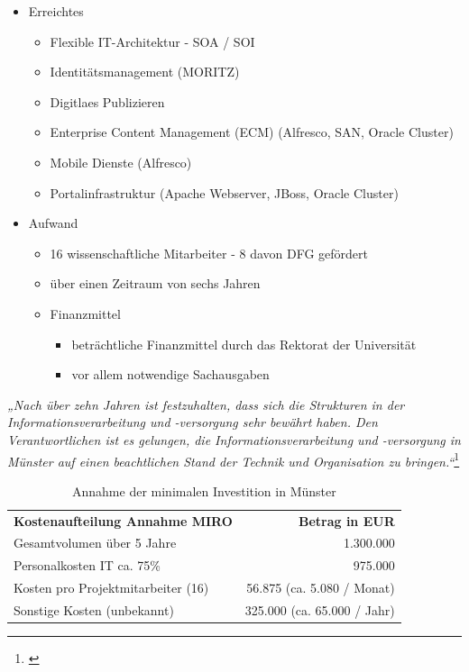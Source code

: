 \begin{itemize}
	\item Erreichtes
	\begin{itemize}
		\item Flexible IT-Architektur - SOA / SOI
		\item Identitätsmanagement (MORITZ)
		\item Digitlaes Publizieren
		\item Enterprise Content Management (ECM) (Alfresco, SAN, Oracle Cluster)
		\item Mobile Dienste (Alfresco)
		\item Portalinfrastruktur (Apache Webserver, JBoss, Oracle Cluster)
	\end{itemize}
	\item Aufwand
	\begin{itemize}
		\item 16 wissenschaftliche Mitarbeiter - 8 davon DFG gefördert
		\item über einen Zeitraum von sechs Jahren
		\item Finanzmittel
		\begin{itemize}
			\item beträchtliche Finanzmittel durch das Rektorat der Universität
			\item vor allem notwendige Sachausgaben
		\end{itemize}
	\end{itemize}
\end{itemize}

\textit{„Nach über zehn Jahren ist festzuhalten, dass sich die Strukturen in der Informationsverarbeitung und -versorgung sehr bewährt haben. Den Verantwortlichen ist es gelungen, die Informationsverarbeitung und -versorgung in Münster auf einen beachtlichen Stand der Technik und Organisation zu bringen.“}\footnote{\cite{bode_informationsmanagement_2010}}

\begin{table}[h!]
	\begin{tabularx}{\textwidth}{l|r}
		\hline
		\textbf{Kostenaufteilung Annahme MIRO} & \textbf{Betrag in EUR}\\
		Gesamtvolumen über 5 Jahre & 1.300.000\\
		Personalkosten IT ca. 75\% & 975.000\\
		Kosten pro Projektmitarbeiter (16) & 56.875 (ca. 5.080 / Monat)\\ 
		Sonstige Kosten (unbekannt) & 325.000 (ca. 65.000 / Jahr)\\
		\hline
    \end{tabularx}
    \caption{Annahme der minimalen Investition in Münster}
    \label{tab_minimale_investition_munster}
\end{table}

